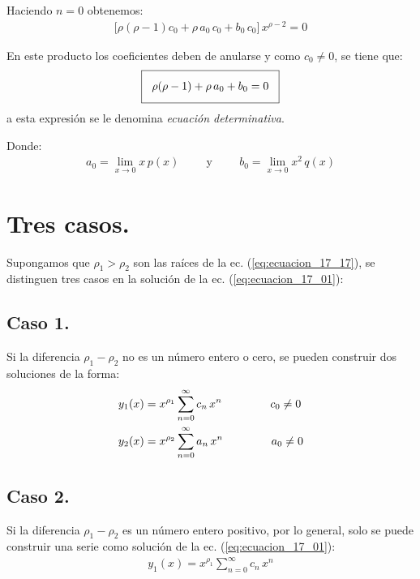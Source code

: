Haciendo $n = 0$ obtenemos:
\begin{align*}
\big[ \rho (\rho - 1) c_{0} + \rho \, a_{0} \, c_{0} + b_{0} \, c_{0} \big] \, x^{\rho-2} = 0
\end{align*}

En este producto los coeficientes deben de anularse y como $c_{0} \neq 0$, se tiene que:
\begin{align}
\setlength{\fboxsep}{3\fboxsep}\boxed{
\rho (\rho - 1) + \rho \, a_{0} + b_{0} = 0 }
\label{eq:ecuacion_17_17}
\end{align}
a esta expresión se le denomina \emph{ecuación determinativa}.
\par
Donde:
\begin{align}
a_{0} = \lim_{x \to 0} x \, p(x) \hspace{1cm} \mbox{y} \hspace{1cm} b_{0} = \lim_{x \to 0} x^{2} \, q(x)
\label{eq:ecuacion_17_18}
\end{align}

\section{Tres casos.}

Supongamos que $\rho_{1} > \rho_{2}$ son las raíces de la ec. (\ref{eq:ecuacion_17_17}), se distinguen tres casos en la solución de la ec. (\ref{eq:ecuacion_17_01}):

\subsection{Caso 1.}\label{caso1}

Si la diferencia $\rho_{1} - \rho_{2}$ no es un número entero o cero, se pueden construir dos soluciones de la forma:
\begin{align*}
y_{1}(x) &= x^{\rho_{1}} \sum_{n=0}^{\infty} c_{n} \, x^{n} \hspace{1.5cm} c_{0} \neq 0 \\ 
y_{2}(x) &= x^{\rho_{2}} \sum_{n=0}^{\infty} a_{n} \, x^{n} \hspace{1.5cm} a_{0} \neq 0
\end{align*}

\subsection{Caso 2.}

Si la diferencia $\rho_{1} - \rho_{2}$ es un número entero positivo, por lo general, solo se puede construir una serie como solución de la ec. (\ref{eq:ecuacion_17_01}):
\begin{align}
y_{1}(x) = x^{\rho_{1}} \sum_{n=0}^{\infty} c_{n} \, x^{n}
\label{eq:ecuacion_17_19}
\end{align}

